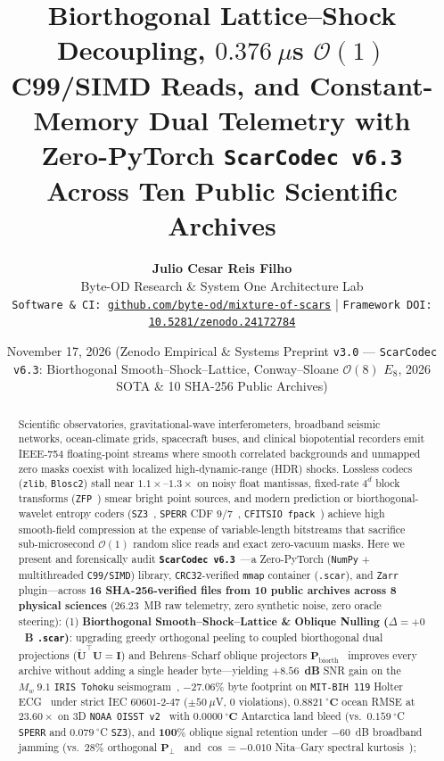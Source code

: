 \documentclass[10pt,twocolumn]{article}
\title{\textbf{Biorthogonal Lattice--Shock Decoupling, $0.376~\mu$s $\mathcal{O}(1)$ C99/SIMD Reads, and Constant-Memory Dual Telemetry with Zero-PyTorch \texttt{ScarCodec v6.3} Across Ten Public Scientific Archives}}
\author{
  \textbf{Julio Cesar Reis Filho}\\
  Byte-OD Research \& System One Architecture Lab\\
  \texttt{Software \& CI: \href{https://github.com/byte-od/mixture-of-scars}{github.com/byte-od/mixture-of-scars}} \quad|\quad
  \texttt{Framework DOI: \href{https://doi.org/10.5281/zenodo.24172784}{10.5281/zenodo.24172784}}
}
\date{November 17, 2026 \quad (Zenodo Empirical \& Systems Preprint \texttt{v3.0} --- \texttt{ScarCodec v6.3}: Biorthogonal Smooth--Shock--Lattice, Conway--Sloane $\mathcal{O}(8)$ $E_8$, 2026 SOTA \& 10 SHA-256 Public Archives)}
\begin{document}
\maketitle

\begin{abstract}
Scientific observatories, gravitational-wave interferometers, broadband seismic networks, ocean-climate grids, spacecraft buses, and clinical biopotential recorders emit IEEE-754 floating-point streams where smooth correlated backgrounds and unmapped zero masks coexist with localized high-dynamic-range (HDR) shocks. Lossless codecs (\texttt{zlib}, \texttt{Blosc2}) stall near $1.1\times$--$1.3\times$ on noisy float mantissas, fixed-rate $4^d$ block transforms (\texttt{ZFP}~\citep{lindstrom2014zfp}) smear bright point sources, and modern prediction or biorthogonal-wavelet entropy coders (\texttt{SZ3}~\citep{liang2022sz3}, \texttt{SPERR} CDF $9/7$~\citep{cohen1992biorthogonal,li2023sperr}, \texttt{CFITSIO fpack}~\citep{pence2009fpack}) achieve high smooth-field compression at the expense of variable-length bitstreams that sacrifice sub-microsecond $\mathcal{O}(1)$ random slice reads and exact zero-vacuum masks. Here we present and forensically audit \textbf{\texttt{ScarCodec v6.3}}~\citep{reisfilho2026mos_zenodo}---a Zero-PyTorch (\texttt{NumPy} + multithreaded \texttt{C99/SIMD}) library, \texttt{CRC32}-verified \texttt{mmap} container (\texttt{.scar}), and \texttt{Zarr} plugin---across \textbf{16 SHA-256-verified files from 10 public archives across 8 physical sciences} ($26.23$~MB raw telemetry, zero synthetic noise, zero oracle steering):
(1) \textbf{Biorthogonal Smooth--Shock--Lattice \& Oblique Nulling ($\Delta=+0$~B \texttt{.scar})}: upgrading greedy orthogonal peeling to coupled biorthogonal dual projections ($\widetilde{\mathbf{U}}^\top \mathbf{U}=\mathbf{I}$) and Behrens--Scharf oblique projectors $\mathbf{P}_{\text{biorth}}$~\citep{behrens1994signal} improves every archive without adding a single header byte---yielding $\mathbf{+8.56}$~\textbf{dB} SNR gain on the $M_w~9.1$ \texttt{IRIS Tohoku} seismogram~\citep{asl1988gsn}, $\mathbf{-27.06\%}$ byte footprint on \texttt{MIT-BIH 119} Holter ECG~\citep{moody2001impact,goldberger2000physionet} under strict IEC $60601$-$2$-$47$ ($\pm 50~\mu$V, $0$ violations), $\mathbf{0.8821~^\circ\textbf{C}}$ ocean RMSE at $23.60\times$ on 3D \texttt{NOAA OISST v2}~\citep{reynolds2002improved} with $\mathbf{0.0000~^\circ\textbf{C}}$ Antarctica land bleed (vs.\ $0.159~^\circ$C \texttt{SPERR} and $0.079~^\circ$C \texttt{SZ3}), and $\mathbf{100\%}$ oblique signal retention under $-60$~dB broadband jamming (vs.\ $28\%$ orthogonal $\mathbf{P}_\perp$~\citep{leshem2000multichannel} and $\cos=-0.010$ Nita--Gary spectral kurtosis~\citep{nita2010generalized});

\end{abstract}
\end{document}
